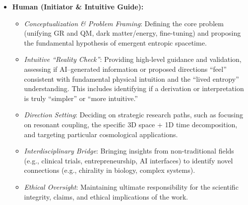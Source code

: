 \documentclass[11pt,a4paper]{article} %
\begin{document}
\begin{itemize}
  \item \textbf{Human (Initiator \& Intuitive Guide):}
    \begin{itemize}
      \item \emph{Conceptualization \& Problem Framing}: Defining the core problem (unifying GR and QM, dark matter/energy, fine-tuning) and proposing the fundamental hypothesis of emergent entropic spacetime.
      \item \emph{Intuitive “Reality Check”}: Providing high-level guidance and validation, assessing if AI–generated information or proposed directions “feel” consistent with fundamental physical intuition and the “lived entropy” understanding. This includes identifying if a derivation or interpretation is truly “simpler” or “more intuitive.”
      \item \emph{Direction Setting}: Deciding on strategic research paths, such as focusing on resonant coupling, the specific 3D space + 1D time decomposition, and targeting particular cosmological applications.
      \item \emph{Interdisciplinary Bridge}: Bringing insights from non-traditional fields (e.g., clinical trials, entrepreneurship, AI interfaces) to identify novel connections (e.g., chirality in biology, complex systems).
      \item \emph{Ethical Oversight}: Maintaining ultimate responsibility for the scientific integrity, claims, and ethical implications of the work.
    \end{itemize}


\end{itemize}
\end{document}
